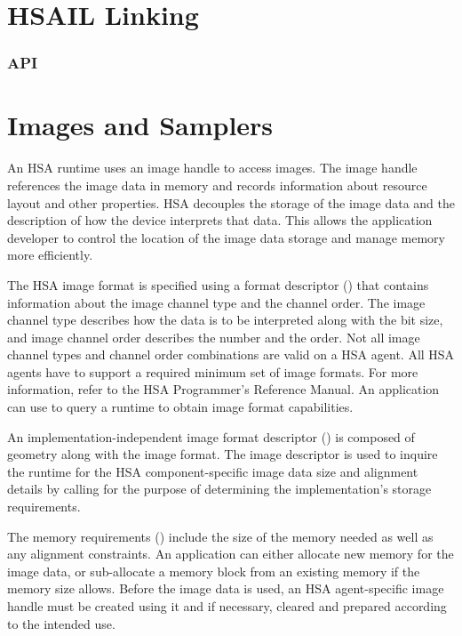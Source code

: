 \documentclass[final]{book}
\begin{document}
\section{HSAIL Linking}\label{linking}
\subsubsection{API}



\section{Images and Samplers}
\label{images} \hypertarget{images}{}

An HSA runtime uses an image handle  to access 
images. The image handle references the image data in memory and records 
information about resource layout and other properties. HSA decouples the 
storage of the image data and the description of how the device interprets that 
data. This allows the application developer to control the location of the 
image data storage and manage memory more efficiently.

The HSA image format is specified using a format descriptor
() that contains information about the image
channel type and the channel order. The image channel type describes how the
data is to be interpreted along with the bit size, and image channel order
describes the number and the order. Not all image channel types and channel
order combinations are valid on a HSA agent. All HSA agents have to support a
required minimum set of image formats. For more information, refer to the HSA 
Programmer's Reference Manual\cite{prm}. An application can use 
 to query a runtime 
to obtain image format capabilities.

An implementation-independent image format descriptor
() is composed of geometry along with the
image format. The image descriptor is used to inquire the runtime for the HSA
component-specific image data size and alignment details by calling
 for the purpose of determining the
implementation's storage requirements.

The memory requirements () include the size of the
memory needed as well as any alignment constraints. An application can either
allocate new memory for the image data, or sub-allocate a memory block from an
existing memory if the memory size allows. Before the image data is used, an HSA
agent-specific image handle must be created using it and if necessary, cleared
and prepared according to the intended use.
\end{document}
